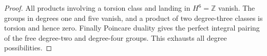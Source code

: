 \begin{proof}
All products involving a torsion class and landing in $H^6=\mathbb Z$
vanish. The groups in degrees one and five vanish, and a product of
two degree-three classes is torsion and hence zero. Finally Poincare
duality gives the perfect integral pairing of the free degree-two
and degree-four groups. This exhausts all degree possibilities.
\end{proof}

